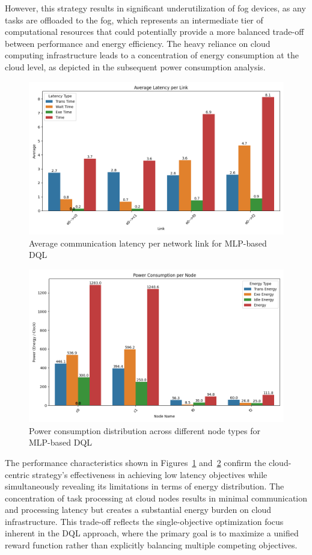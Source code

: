 \documentclass[preprint,3p,authoryear]{elsarticle}
\begin{document}
However, this strategy results in significant underutilization of fog devices, as any tasks are offloaded to the fog, which represents an intermediate tier of computational resources that could potentially provide a more balanced trade-off between performance and energy efficiency. The heavy reliance on cloud computing infrastructure leads to a concentration of energy consumption at the cloud level, as depicted in the subsequent power consumption analysis.

\begin{figure}[H]
    \centering
    \includegraphics[width=0.5\linewidth]{figs/MLP/avg_latency_per_link.png}
    \caption{Average communication latency per network link for MLP-based DQL}
    \label{fig:mlp-avg-latency}
\end{figure}

\begin{figure}[H]
    \centering
    \includegraphics[width=0.5\linewidth]{figs/MLP/power_consumption_per_node.png}
    \caption{Power consumption distribution across different node types for MLP-based DQL}
    \label{fig:mlp-power-consumption}
\end{figure}

The performance characteristics shown in Figures~\ref{fig:mlp-avg-latency} and~\ref{fig:mlp-power-consumption} confirm the cloud-centric strategy's effectiveness in achieving low latency objectives while simultaneously revealing its limitations in terms of energy distribution. The concentration of task processing at cloud nodes results in minimal communication and processing latency but creates a substantial energy burden on cloud infrastructure. This trade-off reflects the single-objective optimization focus inherent in the DQL approach, where the primary goal is to maximize a unified reward function rather than explicitly balancing multiple competing objectives.
\end{document}

